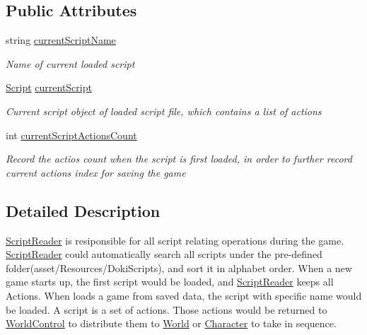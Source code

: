 \subsection*{Public Attributes}
\begin{DoxyCompactItemize}
\item 
string \hyperlink{classdoki_unity_1_1_script_reader_aefa6d9778e246a8fabfe0b706b730023}{current\+Script\+Name}
\begin{DoxyCompactList}\small\item\em Name of current loaded script \end{DoxyCompactList}\item 
\hyperlink{classdoki_script_setting_1_1_script}{Script} \hyperlink{classdoki_unity_1_1_script_reader_a0593f61914a48244470c2fe6b498b0ad}{current\+Script}
\begin{DoxyCompactList}\small\item\em Current script object of loaded script file, which contains a list of actions \end{DoxyCompactList}\item 
int \hyperlink{classdoki_unity_1_1_script_reader_ac9c6272e1333eb07927fc9cfabdbbd72}{current\+Script\+Actions\+Count}
\begin{DoxyCompactList}\small\item\em Record the actios count when the script is first loaded, in order to further record current action\textquotesingle{}s index for saving the game \end{DoxyCompactList}\end{DoxyCompactItemize}


\subsection{Detailed Description}
\hyperlink{classdoki_unity_1_1_script_reader}{Script\+Reader} is resiponsible for all script relating operations during the game. \hyperlink{classdoki_unity_1_1_script_reader}{Script\+Reader} could automatically search all scripts under the pre-\/defined folder(asset/\+Resources/\+Doki\+Scripts), and sort it in alphabet order. When a new game starts up, the first script would be loaded, and \hyperlink{classdoki_unity_1_1_script_reader}{Script\+Reader} keeps all Actions. When loads a game from saved data, the script with specific name would be loaded. A script is a set of actions. Those actions would be returned to \hyperlink{classdoki_unity_1_1_world_control}{World\+Control} to distribute them to \hyperlink{classdoki_unity_1_1_world}{World} or \hyperlink{classdoki_unity_1_1_character}{Character} to take in sequence. 



